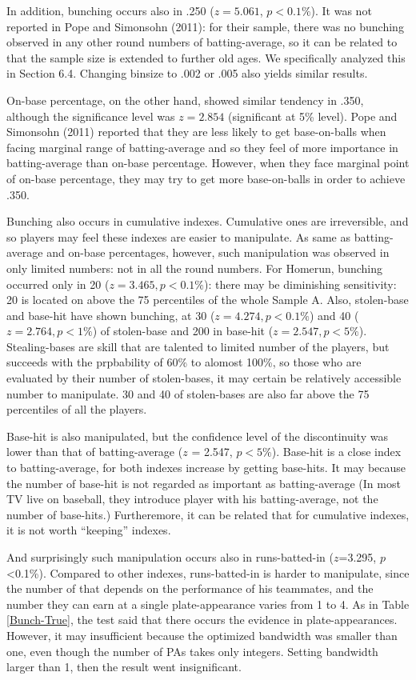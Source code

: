 \documentclass[dvipdfmx, 12pt]{article}
\begin{document}
In addition, bunching occurs also in .250 ($z = 5.061$, $p < 0.1\%$). It was not reported in Pope and Simonsohn (2011): for their sample, there was no bunching observed in any other round numbers of batting-average, so it can be related to that the sample size is extended to further old ages. We specifically analyzed this in Section 6.4. Changing binsize to .002 or .005 also yields similar results.

On-base percentage, on the other hand, showed similar tendency in .350, although the significance level was $z=2.854$ (significant at 5\% level). Pope and Simonsohn (2011) reported that they are less likely to get base-on-balls when facing marginal range of batting-average and so they feel of more importance in batting-average than on-base percentage. However, when they face marginal point of on-base percentage, they may try to get more base-on-balls in order to achieve .350.

Bunching also occurs in cumulative indexes. Cumulative ones are irreversible, and so players may feel these indexes are easier to manipulate. As same as batting-average and on-base percentages, however, such manipulation was observed in only limited numbers: not in all the round numbers. For Homerun, bunching occurred only in 20 ($z=3.465, p < 0.1\%$): there may be diminishing sensitivity: 20 is located on above the 75 percentiles of the whole Sample A. Also, stolen-base and base-hit have shown bunching, at 30 ($z=4.274, p < 0.1\%$) and 40 ($z=2.764, p < 1\%$) of stolen-base and 200 in base-hit ($z=2.547, p < 5\%$). Stealing-bases are skill that are talented to limited number of the players, but succeeds with the prpbability of 60\% to alomost 100\%, so those who are evaluated by their number of stolen-bases, it may certain be relatively accessible number to manipulate. 30 and 40 of stolen-bases are also far above the 75 percentiles of all the players.

Base-hit is also manipulated, but the confidence level of the discontinuity was lower than that of batting-average ($z$ = 2.547, $p < 5\%$). Base-hit is a close index to batting-average, for both indexes increase by getting base-hits. It may because the number of base-hit is not regarded as important as batting-average (In most TV live on baseball, they introduce player with his batting-average, not the number of base-hits.) Furtheremore, it can be related that for cumulative indexes, it is not worth ``keeping'' indexes.

And surprisingly such manipulation occurs also in runs-batted-in ($z$=3.295, $p$<0.1\%). Compared to other indexes, runs-batted-in is harder to manipulate, since the number of that depends on the performance of his teammates, and the number they can earn at a single plate-appearance varies from 1 to 4. As in Table \ref{Bunch-True}, the test said that there occurs the evidence in plate-appearances. However, it may insufficient because the optimized bandwidth was smaller than one, even though the number of PAs takes only integers. Setting bandwidth larger than 1, then the result went insignificant.
\end{document}
